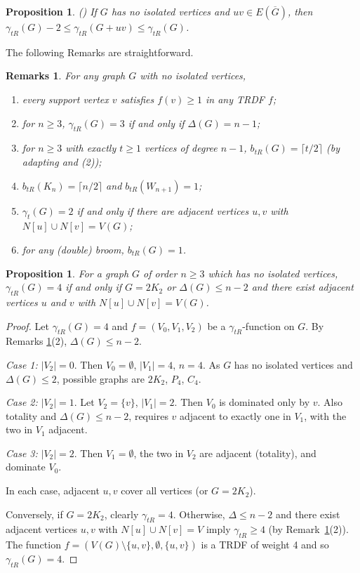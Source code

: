 \documentclass[12pt,reqno]{amsart}
\theoremstyle{plain}
\newtheorem{prelem}{{\bf Proposition}}
\newtheorem{remarks}[theorem]{Remarks}
\newtheorem{proposition}[theorem]{Proposition}
\numberwithin{equation}{section}
\begin{document}
\begin{prelem}\label{Pro} 
 (\cite[Proposition~2.3]{chloe}) If $G$ has no isolated vertices and $uv\in E(\overline{G})$, then $\gamma_{tR}(G)-2\leq \gamma_{tR}(G+uv)\leq \gamma_{tR}(G)$.
\end{prelem}

 The following Remarks are straightforward.
\begin{remarks}\label{Remarks}
For any graph $G$ with no isolated vertices,
\begin{enumerate}
\item every support vertex $v$ satisfies $f(v)\geq 1$ in any TRDF $f$;
\item for $n\geq 3$, $\gamma_{tR}(G)=3$ if and only if $\Delta(G)=n-1$;
\item for $n\geq 3$ with exactly $t\geq 1$ vertices of degree $n-1$, $b_{tR}(G)=\lceil t/2\rceil$ (by adapting \cite[Lemma~3.1]{HuXu} and (2));
\item $b_{tR}(K_n)=\lceil n/2\rceil$ and $b_{tR}(W_{n+1})=1$;
\item $\gamma_t(G)=2$ if and only if there are adjacent vertices $u,v$ with $N[u]\cup N[v]=V(G)$;
\item for any (double) broom, $b_{tR}(G)=1$.
\end{enumerate}
\end{remarks}

\begin{proposition}\label{4R}
For a graph $G$ of order $n\geq 3$ which has no isolated vertices, $\gamma _{tR}(G)=4$ if and only if $G=2K_{2}$ or $\Delta (G)\leq n-2$ and there exist adjacent vertices $u$ and $v$ with $N[u]\cup N[v]=V(G)$.
\end{proposition}
\begin{proof}
Let $\gamma_{tR}(G)=4$ and $f=(V_0,V_1,V_2)$ be a $\gamma_{tR}$-function on $G$. By Remarks \ref{Remarks}(2), $\Delta(G)\leq n-2$. 

\textit{Case 1:} $|V_2|=0$. Then $V_0=\emptyset$, $|V_1|=4$, $n=4$. As $G$ has no isolated vertices and $\Delta(G) \leq 2$, possible graphs are $2K_2$, $P_4$, $C_4$.

\textit{Case 2:} $|V_2|=1$. Let $V_2=\{v\}$, $|V_1|=2$. Then $V_0$ is dominated only by $v$. Also totality and $\Delta(G)\leq n-2$,  requires $v$ adjacent to exactly one in $V_1$, with the two in $V_1$ adjacent.

\textit{Case 3:} $|V_2|=2$. Then $V_1=\emptyset$, the two in $V_2$ are adjacent (totality), and dominate $V_0$.

In each case, adjacent $u,v$ cover all vertices (or $G=2K_2$).


Conversely, if $G=2K_2$, clearly $\gamma_{tR}=4$. Otherwise, $\Delta\leq n-2$ and there exist adjacent vertices $u,v$ with $N[u]\cup N[v]=V$ imply $\gamma_{tR}\geq 4$ (by Remark~\ref{Remarks}(2)). The function $f=(V(G)\setminus\{u,v\},\emptyset,\{u,v\})$ is a TRDF of weight 4 and so $\gamma _{tR}(G)=4$.
\end{proof}
\end{document}
